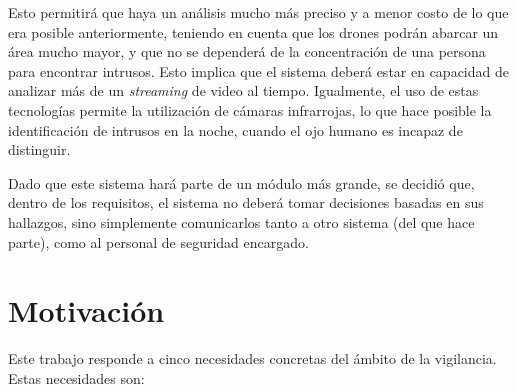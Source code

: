 Esto permitirá que haya un análisis mucho más preciso y a menor costo de lo que era posible anteriormente, teniendo en cuenta que los drones podrán abarcar un área mucho mayor, y que no se dependerá de la concentración de una persona para encontrar intrusos. Esto implica que el sistema deberá estar en capacidad de analizar más de un \textit{streaming} de video al tiempo. Igualmente, el uso de estas tecnologías permite la utilización de cámaras infrarrojas, lo que hace posible la identificación de intrusos en la noche, cuando el ojo humano es incapaz de distinguir. 

Dado que este sistema hará parte de un módulo más grande, se decidió que, dentro de los requisitos, el sistema no deberá tomar decisiones basadas en sus hallazgos, sino simplemente comunicarlos tanto a otro sistema (del que hace parte), como al personal de seguridad encargado.


\section{Motivación}

Este trabajo responde a cinco necesidades concretas del ámbito de la vigilancia. Estas necesidades son:

